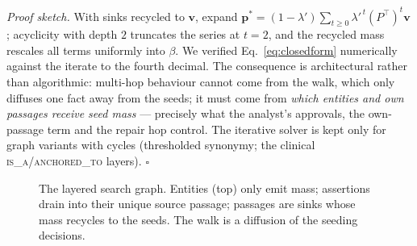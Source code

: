 \documentclass[11pt,a4paper]{article}
\begin{document}
\noindent\emph{Proof sketch.} With sinks recycled to $\mathbf v$, expand
$\mathbf p^{*}=(1-\lambda')\sum_{t\ge0}\lambda'^{\,t}(P^{\!\top})^{t}\mathbf v$;
acyclicity with depth $2$ truncates the series at $t{=}2$, and the recycled
mass rescales all terms uniformly into $\beta$. We verified
Eq.~\eqref{eq:closedform} numerically against the iterate to the fourth
decimal. The consequence is architectural rather than algorithmic: multi-hop
behaviour cannot come from the walk, which only diffuses one fact away from
the seeds; it must come from \emph{which entities and own passages receive
seed mass} --- precisely what the analyst's approvals, the own-passage term
and the repair hop control. The iterative solver is kept only for graph
variants with cycles (thresholded synonymy; the clinical
\textsc{is\_a}/\textsc{anchored\_to} layers). \hfill$\square$

\begin{figure}[t]
\centering
{}
\caption{The layered search graph. Entities (top) only emit mass; assertions
drain into their unique source passage; passages are sinks whose mass
recycles to the seeds. The walk is a diffusion of the seeding decisions.}
\label{fig:layers}
\end{figure}
\end{document}
